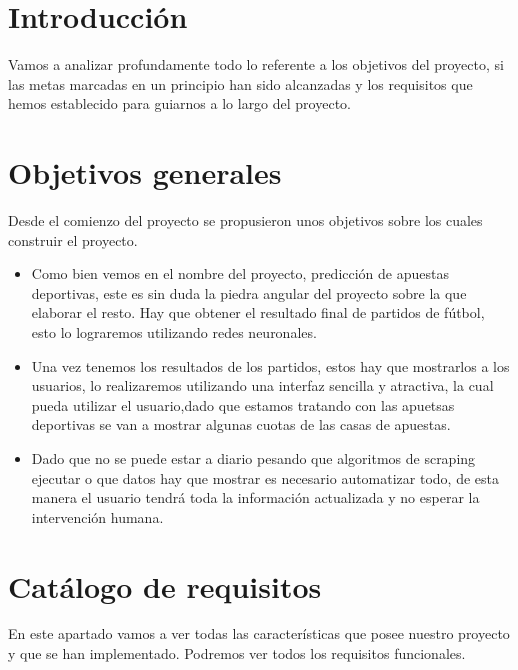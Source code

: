 
\section{Introducción}
Vamos a analizar profundamente  todo lo referente a los objetivos del proyecto, si las metas marcadas en un principio han sido alcanzadas y los requisitos que hemos establecido para guiarnos a lo largo del proyecto.
\section{Objetivos generales}
Desde el comienzo del proyecto se propusieron unos objetivos sobre los cuales construir el proyecto.
\begin{itemize}
\item Como bien vemos en el nombre del proyecto, predicción de apuestas deportivas, este es sin duda la piedra angular del proyecto sobre la que elaborar el resto. Hay que obtener el resultado final de partidos de fútbol, esto lo lograremos utilizando redes neuronales.

\item Una vez tenemos los resultados de los partidos, estos hay que mostrarlos a los usuarios, lo realizaremos utilizando una interfaz sencilla y atractiva, la cual pueda utilizar el usuario,dado que estamos tratando con las apuetsas deportivas se van a mostrar algunas cuotas de las casas de apuestas.

\item Dado que no se puede estar a diario pesando que algoritmos de scraping ejecutar o que datos hay que mostrar es necesario automatizar todo, de esta manera el usuario tendrá toda la información actualizada y no esperar la intervención humana.
\end{itemize}
\section{Catálogo de requisitos}
En este apartado vamos a ver todas las características que posee nuestro proyecto y que se han implementado. Podremos ver todos los requisitos funcionales.

